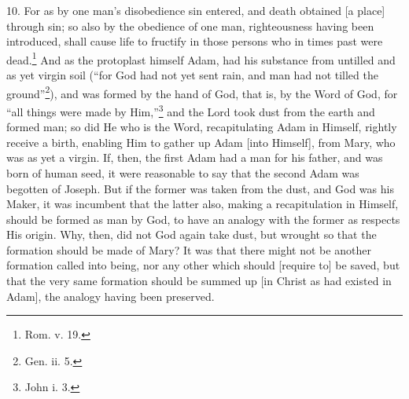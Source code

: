 10. For as by one man’s disobedience sin entered, and death obtained [a place] through sin; so also by the obedience of one man, righteousness having been introduced, shall cause life to fructify in those persons who in times past were dead.\footnote{Rom. v. 19.} And as the protoplast himself Adam, had his substance from untilled and as yet virgin soil (“for God had not yet sent rain, and man had not tilled the ground”\footnote{Gen. ii. 5.}), and was formed by the hand of God, that is, by the Word of God, for “all things were made by Him,”\footnote{John i. 3.} and the Lord took dust from the earth and formed man; so did He who is the Word, recapitulating Adam in Himself, rightly receive a birth, enabling Him to gather up Adam [into Himself], from Mary, who was as yet a virgin. If, then, the first Adam had a man for his father, and was born of human seed, it were reasonable to say that the second Adam was begotten of Joseph. But if the former was taken from the dust, and God was his Maker, it was incumbent that the latter also, making a recapitulation in Himself, should be formed as man by God, to have an analogy with the former as respects His origin. Why, then, did not God again take dust, but wrought so that the formation should be made of Mary? It was that there might not be another formation called into being, nor any other which should [require to] be saved, but that the very same formation should be summed up [in Christ as had existed in Adam], the analogy having been preserved.


